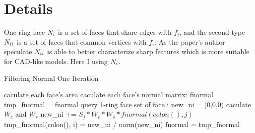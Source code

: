 \documentclass{article}
\theoremstyle{definition}
\theoremstyle{remark}
\newcommand{\rom}[1]{\uppercase\expandafter{\romannumeral #1\relax}}
\begin{document}
\section{Details}
One-ring face $N_{\rom{1}}$ is a set of faces that share edges with $f_i$, and the second type $N_{\rom{2}}$ is a set of faces that common vertices with $f_i$. As the paper's author speculate $N_{\rom{2}}$ is able to better characterize sharp features which is more suitable for CAD-like models. Here I using $N_{\rom{1}}$.
\begin{algorithm}
\caption{Filtering Normal One Iteration}\label{euclid}
\begin{algorithmic}
 \State caculate each face's area
 \State caculate each face's normal matrix: fnormal
 \State tmp\_fnormal = fnormal
 \EndProcedure
 \State query 1-ring face set of face i
 \State new\_ni = (0,0,0)
 \State caculate $W_c$  and $W_s$
 \State new\_ni += $S_j*W_c*W_s*fnormal(colon(), j)$
 \EndFor
 \State tmp\_fnormal(colon(), i) = new\_ni / norm(new\_ni)
\EndFor
\State fnormal = tmp\_fnormal
\end{algorithmic}
\end{algorithm}








\end{document}
